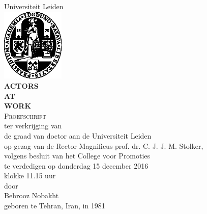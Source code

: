 \documentclass[10pt]{article}
\begin{document}
 
\begin{center}

{\large Universiteit Leiden} \\[1em]
\includegraphics[width=3cm]{figs/ullogo} \\[3em]

{\Large \uppercase{\textbf{Actors\\ at\\ Work}}}\\[3em]
{\large \textsc{Proefschrift}\\[2em]}
{ter verkrijging van\\
de graad van doctor aan de Universiteit Leiden\\
op gezag van de Rector Magnificus prof. dr. C. J. J. M. Stolker,\\
volgens besluit van het College voor Promoties\\
te verdedigen       
op donderdag 15 december 2016\\
klokke 11.15 uur \\[1em]}
{door\\[2em]}
{\large Behrooz Nobakht\\[2em]}    
{geboren te Tehran, Iran, in 1981}
\end{center}
\end{document}
